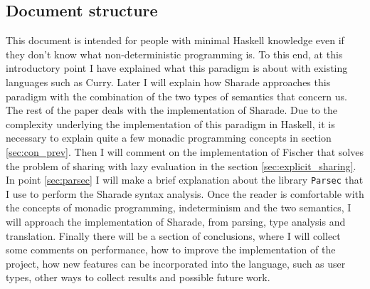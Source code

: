 \documentclass[class=article, crop=false]{standalone}
\begin{document}
\subsection{Document structure}
This document is intended for people with minimal Haskell knowledge even if they don't know
what non-deterministic programming is. To this end, at this introductory point I have
explained what this paradigm is about with existing languages such as Curry. Later I will
explain how Sharade approaches this paradigm with the combination of the two types of
semantics that concern us. The rest of the paper deals with the implementation of Sharade.
Due to the complexity underlying the implementation of this paradigm in Haskell, it is
necessary to explain quite a few monadic programming concepts in section \ref{sec:con_prev}.
Then I will comment on the implementation of Fischer that solves the problem of sharing with
lazy evaluation in the section \ref{sec:explicit_sharing}. In point \ref{sec:parsec} I will
make a brief explanation about the library \verb`Parsec` that I use to perform the Sharade
syntax analysis. Once the reader is comfortable with the concepts of monadic programming,
indeterminism and the two semantics, I will approach the implementation of Sharade, from
parsing, type analysis and translation. Finally there will be a section of conclusions, where
I will collect some comments on performance, how to improve the implementation of the
project, how new features can be incorporated into the language, such as user types, other
ways to collect results and possible future work.
\end{document}
